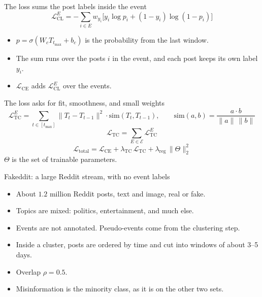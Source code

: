 \begin{frame}{The loss sums the post labels inside the event}
  \[
    \mathcal{L}^{E}_{\mathrm{CL}}
    = -\sum_{i\in E} w_{y_i}
      \bigl[y_i\log p_i+(1-y_i)\log(1-p_i)\bigr]
  \]
  \begin{itemize}
    \item $p=\sigma(W_c T_{t_{\max}}+b_c)$ is the probability from the last window.
    \item The sum runs over the posts $i$ in the event, and each post keeps its own label $y_i$.
    \item $\mathcal{L}_{\mathrm{CE}}$ adds $\mathcal{L}^{E}_{\mathrm{CL}}$ over the events.
  \end{itemize}
\end{frame}

\begin{frame}{The loss asks for fit, smoothness, and small weights}
  \[
    \mathcal{L}^{E}_{\mathrm{TC}}
    = \sum_{t\in[t_{\max}]}
      \|T_t-T_{t-1}\|^{2}
      \cdot \mathrm{sim}(T_t,T_{t-1}),
    \qquad
    \mathrm{sim}(a,b)=\frac{a\cdot b}{\|a\|\,\|b\|}
  \]
  \[
    \mathcal{L}_{\mathrm{TC}}
    = \sum_{E\in\mathcal{E}}\mathcal{L}^{E}_{\mathrm{TC}}
  \]
  \vspace{0.2em}
  \[
    \mathcal{L}_{\mathrm{total}}
    = \mathcal{L}_{\mathrm{CE}}
    + \lambda_{\mathrm{TC}}\,\mathcal{L}_{\mathrm{TC}}
    + \lambda_{\mathrm{reg}}\,\|\Theta\|_2^2
  \]
  $\Theta$ is the set of trainable parameters.
\end{frame}

\begin{frame}{Fakeddit: a large Reddit stream, with no event labels}
  \begin{itemize}
    \item About $1.2$ million Reddit posts, text and image, real or fake.
    \item Topics are mixed: politics, entertainment, and much else.
    \item Events are not annotated. Pseudo-events come from the clustering step.
    \item Inside a cluster, posts are ordered by time and cut into windows of about 3--5 days.
    \item Overlap $\rho=0.5$.
    \item Misinformation is the minority class, as it is on the other two sets.
  \end{itemize}
\end{frame}

